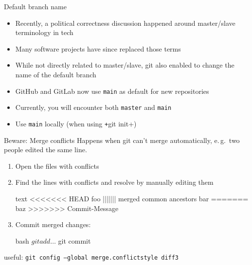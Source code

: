 \begin{frame}[c, fragile]{Default branch name}

  \begin{itemize}
    \item Recently, a political correctness discussion happened around  master/slave terminology in tech
    \item Many software projects have since replaced those terms
    \item While not directly related to master/slave, git also enabled to change the name of the default branch
    \item GitHub and GitLab now use \texttt{main} as default for new repositories
    \item Currently, you will encounter both \texttt{master} and \texttt{main}
    \item Use \texttt{main} locally (when using \texttt+git init+)
  \end{itemize}

\end{frame}

\begin{frame}[fragile]{Beware: Merge conflicts}
  Happens when git can't merge automatically, e.\,g.\ two people edited the same line.

  \begin{enumerate}
    \item Open the files with conflicts
    \item Find the lines with conflicts and resolve by manually editing them
      \begin{code}{text}
        <<<<<<< HEAD
        foo
        ||||||| merged common ancestors
        bar
        =======
        baz
        >>>>>>> Commit-Message
      \end{code}
    \item Commit merged changes:
      \begin{code}{bash}
        $ git add …
        $ git commit
      \end{code}
  \end{enumerate}
  useful: \texttt{git config --global merge.conflictstyle diff3}
\end{frame}

